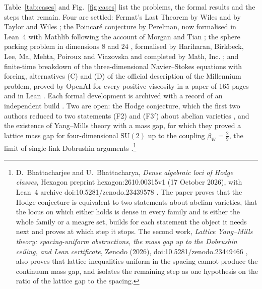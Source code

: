Table~\ref{tab:cases} and Fig.~\ref{fig:cases} list the problems, the formal results and the steps that remain. Four are settled: Fermat's Last Theorem by Wiles and by Taylor and Wiles \cite{Wil95,TW95}; the Poincar\'e conjecture by Perelman, now formalised in Lean~4 with Mathlib following the account of Morgan and Tian \cite{ZDC26}; the sphere packing problem in dimensions $8$ and $24$ \cite{Via17,CKM17}, formalised by Hariharan, Birkbeck, Lee, Ma, Mehta, Poiroux and Viazovska and completed by Math, Inc. \cite{HBL26}; and finite-time breakdown of the three-dimensional Navier--Stokes equations with forcing, alternatives (C) and (D) of the official description of the Millennium problem, proved by OpenAI for every positive viscosity in a paper of 165 pages and in Lean \cite{OAI26}. Each formal development is archived with a record of an independent build \cite{ArcNS,ArcPC,ArcSP}. Two are open: the Hodge conjecture, which the first two authors reduced to two statements (F2) and (F3$'$) about abelian varieties \cite{BB26c}, and the existence of Yang--Mills theory with a mass gap, for which they proved a lattice mass gap for four-dimensional $\mathrm{SU}(2)$ up to the coupling $\beta_{W}=\frac29$, the limit of single-link Dobrushin arguments \cite{BB26d}.\footnote{D.~Bhattacharjee and U.~Bhattacharya, \emph{Dense algebraic loci of Hodge classes}, Hexagon preprint hexagon:2610.00315v1 (17 October 2026), with Lean~4 archive doi:10.5281/zenodo.23439578 \cite{BB26c}. The paper proves that the Hodge conjecture is equivalent to two statements about abelian varieties, that the locus on which either holds is dense in every family and is either the whole family or a meagre set, builds for each statement the object it needs next and proves at which step it stops. The second work, \emph{Lattice Yang--Mills theory: spacing-uniform obstructions, the mass gap up to the Dobrushin ceiling, and Lean certificate}, Zenodo (2026), doi:10.5281/zenodo.23449466 \cite{BB26d}, also proves that lattice inequalities uniform in the spacing cannot produce the continuum mass gap, and isolates the remaining step as one hypothesis on the ratio of the lattice gap to the spacing.}

